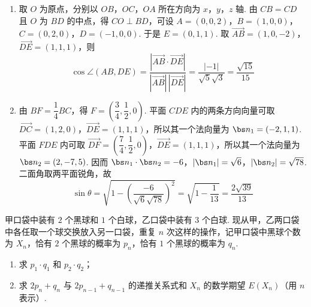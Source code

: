 \begin{solution}
\begin{enumerate}
\item 取 \(O\) 为原点，分别以 \(OB\)，\(OC\)，\(OA\) 所在方向为 \(x\)，\(y\)，\(z\) 轴. 由 \(CB=CD\) 且 \(O\) 为 \(BD\) 的中点，得 \(CO\perp BD\)，可设
\(A=(0,0,2)\)，\(B=(1,0,0)\)，\(C=(0,2,0)\)，\(D=(-1,0,0)\).
于是 \(E=(0,1,1)\). 取 \(\overrightarrow{AB}=(1,0,-2)\)，\(\overrightarrow{DE}=(1,1,1)\)，则
\[
\cos\angle(AB,DE)=\dfrac{\left|\overrightarrow{AB}\cdot\overrightarrow{DE}\right|}{|\overrightarrow{AB}|\,|\overrightarrow{DE}|}=\dfrac{|-1|}{\sqrt5\sqrt3}=\dfrac{\sqrt{15}}{15}
\]
\item 由 \(BF=\dfrac14BC\)，得 \(F=\left(\dfrac34,\dfrac12,0\right)\). 平面 \(CDE\) 内的两条方向向量可取 \(\overrightarrow{DC}=(1,2,0)\)，\(\overrightarrow{DE}=(1,1,1)\)，所以其一个法向量为 \(\bs n_1=(-2,1,1)\). 平面 \(FDE\) 内可取 \(\overrightarrow{DF}=\left(\dfrac74,\dfrac12,0\right)\)，\(\overrightarrow{DE}=(1,1,1)\)，所以其一个法向量为 \(\bs n_2=(2,-7,5)\). 因而
\(\bs n_1\cdot\bs n_2=-6\)，\(|\bs n_1|=\sqrt6\)，\(|\bs n_2|=\sqrt{78}\).
二面角取两平面锐角，故
\[
\sin\theta=\sqrt{1-\left(\dfrac{-6}{\sqrt6\sqrt{78}}\right)^2}=\sqrt{1-\dfrac1{13}}=\dfrac{2\sqrt{39}}{13}
\]
\end{enumerate}
\end{solution}

\begin{problem}
甲口袋中装有 \(2\) 个黑球和 \(1\) 个白球，乙口袋中装有 \(3\) 个白球. 现从甲，乙两口袋中各任取一个球交换放入另一口袋，重复 \(n\) 次这样的操作，记甲口袋中黑球个数为 \(X_n\)，恰有 \(2\) 个黑球的概率为 \(p_n\)，恰有 \(1\) 个黑球的概率为 \(q_n\).

\begin{enumerate}
\item 求 \(p_1\cdot q_1\) 和 \(p_2\cdot q_2\)；
\item 求 \(2p_n+q_n\) 与 \(2p_{n-1}+q_{n-1}\) 的递推关系式和 \(X_n\) 的数学期望 \(E(X_n)\)（用 \(n\) 表示）.
\end{enumerate}
\end{problem}

